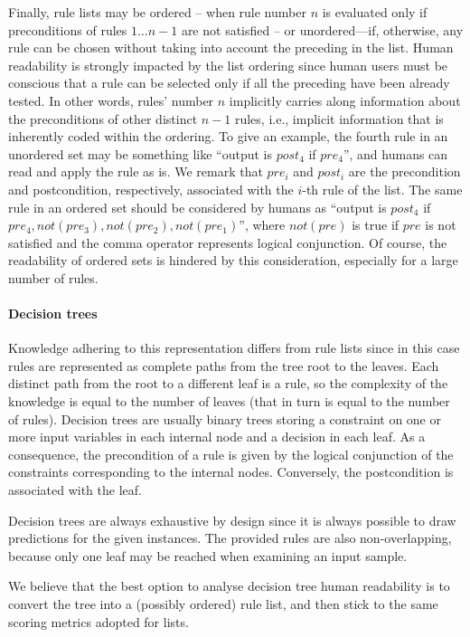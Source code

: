 \documentclass[sigconf]{acmart}
\begin{document}
Finally, rule lists may be ordered -- when rule number $n$ is evaluated only if preconditions of rules $1 \dots n-1$ are not satisfied -- or unordered---if, otherwise, any rule can be chosen without taking into account the preceding in the list.
%
Human readability is strongly impacted by the list ordering since human users must be conscious that a rule can be selected only if all the preceding have been already tested.
%
In other words, rules' number $n$ implicitly carries along information about the preconditions of other distinct $n-1$ rules, i.e., implicit information that is inherently coded within the ordering.
%
To give an example, the fourth rule in an unordered set may be something like ``output is $post_4$ if $pre_4$'', and humans can read and apply the rule as is.
%
We remark that $pre_i$ and $post_i$ are the precondition and postcondition, respectively, associated with the $i$-th rule of the list.
%
The same rule in an ordered set should be considered by humans as ``output is $post_4$ if $pre_4, not(pre_3), not(pre_2), not(pre_1)$'', where $not(pre)$ is true if $pre$ is not satisfied and the comma operator represents logical conjunction.
%
Of course, the readability of ordered sets is hindered by this consideration, especially for a large number of rules.

\paragraph{Decision trees}

Knowledge adhering to this representation differs from rule lists since in this case rules are represented as complete paths from the tree root to the leaves.
%
Each distinct path from the root to a different leaf is a rule, so the complexity of the knowledge is equal to the number of leaves (that in turn is equal to the number of rules).
%
Decision trees are usually binary trees storing a constraint on one or more input variables in each internal node and a decision in each leaf.
%
As a consequence, the precondition of a rule is given by the logical conjunction of the constraints corresponding to the internal nodes.
%
Conversely, the postcondition is associated with the leaf.

Decision trees are always exhaustive by design since it is always possible to draw predictions for the given instances.
%
The provided rules are also non-overlapping, because only one leaf may be reached when examining an input sample.

We believe that the best option to analyse decision tree human readability is to convert the tree into a (possibly ordered) rule list, and then stick to the same scoring metrics adopted for lists.
\end{document}
